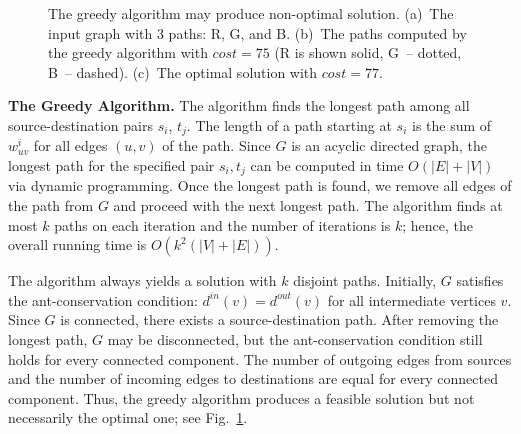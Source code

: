 \documentclass[runningheads]{llncs}
\begin{document}
\begin{figure}[t]
    \center
\hfill
\hfill
    \caption{The greedy algorithm may produce non-optimal solution.
    (a)~The input graph with 3 paths: R, G, and B.
    (b)~The paths computed by the greedy algorithm with $cost=75$
    (R is shown solid, G~-- dotted, B~-- dashed).
    (c)~The optimal solution with $cost=77$.}
    \label{fig:greedywrong}
\end{figure}

{\bf The Greedy Algorithm.}
The algorithm finds the longest path among all source-destination pairs $s_i$, $t_j$.
The length of a path starting
at $s_i$ is the sum of $w^i_{uv}$ for all edges $(u,v)$ of the path.
Since $G$ is an acyclic directed graph, the longest path for the
specified pair $s_i, t_j$ can be computed in time $O(|E|+|V|)$ via
dynamic programming. Once the longest path is found, we remove all
edges of the path from $G$ and proceed with the next longest path. The
algorithm finds at most $k$ paths on each iteration and the number of
iterations is $k$; hence, the overall running time is
$O(k^2(|V|+|E|))$.


The algorithm always yields a solution with $k$ disjoint paths.
Initially, $G$ satisfies the ant-conservation condition:
$d^{in}(v)=d^{out}(v)$ for all intermediate vertices $v$.
Since $G$ is connected, there exists a source-destination path. After removing the longest path, $G$
may be disconnected, but the ant-conservation condition still holds
for every connected component.
The number of outgoing edges from sources
and the number of incoming edges to destinations are equal for every
connected component.
Thus, the greedy algorithm produces a feasible solution but not necessarily the optimal one; see
Fig.~\ref{fig:greedywrong}.
\end{document}
